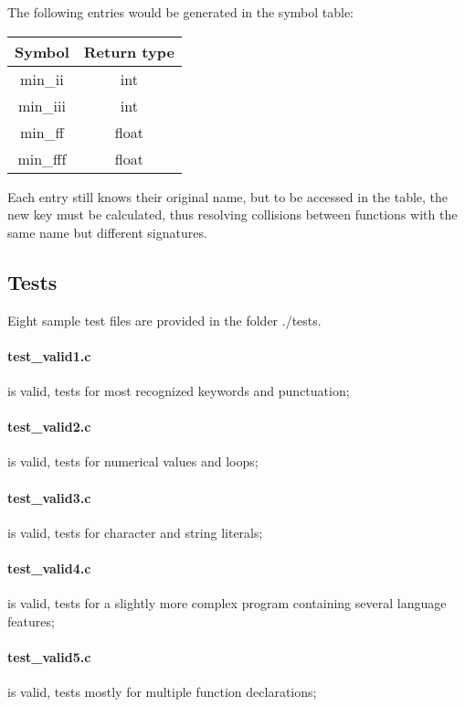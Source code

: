 \documentclass[12pt]{article}
\begin{document}
The following entries would be generated in the symbol table:

\begin{table}[h]
 \centering
\begin{tabular}{c c}
\hline
Symbol    &   Return type \\
\hline
min\_ii    &          int \\
min\_iii   &          int \\
min\_ff    &          float \\
min\_fff   &          float  \\
\hline
\end{tabular}
\end{table}

Each entry still knows their original name, but to be accessed in the table, the
new key must be calculated, thus resolving collisions between functions with the
same name but different signatures.

\subsection{Tests}
Eight sample test files are provided in the folder ./tests.

\paragraph{test{\_}valid1.c} is valid, tests for most recognized keywords and punctuation;
\paragraph{test{\_}valid2.c} is valid, tests for numerical values and loops;
\paragraph{test{\_}valid3.c} is valid, tests for character and string literals;
\paragraph{test{\_}valid4.c} is valid, tests for a slightly more complex program containing several language features;
\paragraph{test{\_}valid5.c} is valid, tests mostly for multiple function declarations;
\end{document}
